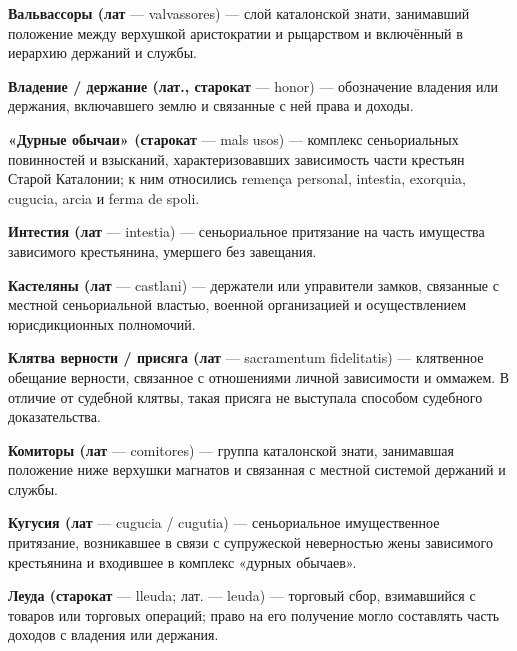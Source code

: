 \noindent\textbf{Вальвассоры (лат} --- valvassores) --- слой каталонской знати, занимавший положение между верхушкой аристократии и рыцарством и включённый в иерархию держаний и службы.
\par\medskip

\noindent\textbf{Владение / держание (лат., старокат} --- honor) --- обозначение владения или держания, включавшего землю и связанные с ней права и доходы.
\par\medskip

\noindent\textbf{«Дурные обычаи» (старокат} --- mals usos) --- комплекс сеньориальных повинностей и взысканий, характеризовавших зависимость части крестьян Старой Каталонии; к ним относились remença personal, intestia, exorquia, cugucia, arcia и ferma de spoli.
\par\medskip

\noindent\textbf{Интестия (лат} --- intestia) --- сеньориальное притязание на часть имущества зависимого крестьянина, умершего без завещания.
\par\medskip

\noindent\textbf{Кастеляны (лат} --- castlani) --- держатели или управители замков, связанные с местной сеньориальной властью, военной организацией и осуществлением юрисдикционных полномочий.
\par\medskip

\noindent\textbf{Клятва верности / присяга (лат} --- sacramentum fidelitatis) --- клятвенное обещание верности, связанное с отношениями личной зависимости и оммажем. В отличие от судебной клятвы, такая присяга не выступала способом судебного доказательства.
\par\medskip

\noindent\textbf{Комиторы (лат} --- comitores) --- группа каталонской знати, занимавшая положение ниже верхушки магнатов и связанная с местной системой держаний и службы.
\par\medskip

\noindent\textbf{Кугусия (лат} --- cugucia / cugutia) --- сеньориальное имущественное притязание, возникавшее в связи с супружеской неверностью жены зависимого крестьянина и входившее в комплекс «дурных обычаев».
\par\medskip

\noindent\textbf{Леуда (старокат} --- lleuda; лат. --- leuda) --- торговый сбор, взимавшийся с товаров или торговых операций; право на его получение могло составлять часть доходов с владения или держания.
\par\medskip

